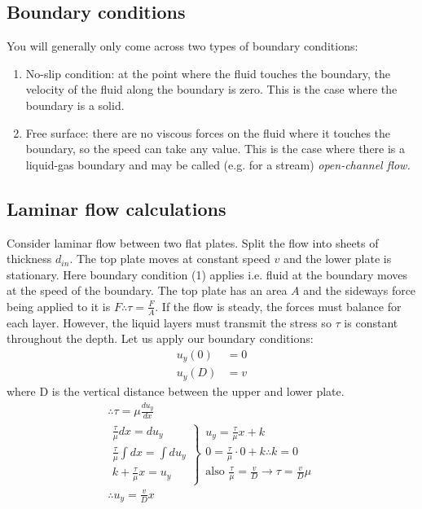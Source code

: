 \subsection{Boundary conditions}
You will generally only come across two types of boundary conditions:
\begin{enumerate}[noitemsep]
  \item No-slip condition: at the point where the fluid touches the boundary, the velocity of the fluid along the boundary is zero. This is the case where the boundary is a solid.
  \item Free surface: there are no viscous forces on the fluid where it touches the boundary, so the speed can take any value. This is the case where there is a liquid-gas boundary and may be called (e.g. for a stream) \emph{open-channel flow.}
\end{enumerate}
\subsection{Laminar flow calculations}
Consider laminar flow between two flat plates. Split the flow into sheets of thickness \(d_{in}\). The top plate moves at constant speed \(v\) and the lower plate is stationary. Here boundary condition (1) applies i.e. fluid at the boundary moves at the speed of the boundary. The top plate has an area \(A\) and the sideways force being applied to it is \(F \therefore \tau = \frac{F}{A} \). If the flow is steady, the forces must balance for each layer. However, the liquid layers must transmit the stress so \(\tau\) is constant throughout the depth. Let us apply our boundary conditions:
\begin{align}
  u_y(0) & = 0 \\
  u_y(D) & = v
\end{align}
where D is the vertical distance between the upper and lower plate.
\begin{gather}
  \therefore \tau = \mu \frac{du_y}{dx} \\
  \left.
  \begin{array}{r}
    \frac{\tau}{\mu} dx = du_y          \\
    \frac{\tau}{\mu}\int dx = \int du_y \\
    k + \frac{\tau}{\mu}x = u_y
  \end{array}
  \right\}
  \begin{array}{l}
    u_y = \frac{\tau}{\mu}x + k                     \\
    0 = \frac{\tau}{\mu}\cdot 0 +k \therefore k = 0 \\
    \textrm{also } \frac{\tau}{\mu} = \frac{v}{D} \rightarrow \tau = \frac{v}{D}\mu
  \end{array}\\
  \therefore u_y = \frac{v}{D}x
\end{gather}
